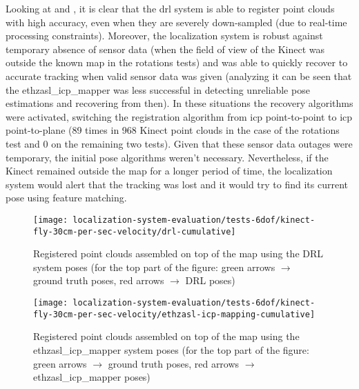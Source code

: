 Looking at  and , it is clear that the \gls{drl} system is able to register point clouds with high accuracy, even when they are severely down-sampled (due to real-time processing constraints). Moreover, the localization system is robust against temporary absence of sensor data (when the field of view of the Kinect was outside the known map in the rotations tests) and was able to quickly recover to accurate tracking when valid sensor data was given (analyzing  it can be seen that the ethzasl\_icp\_mapper was less successful in detecting unreliable pose estimations and recovering from then). In these situations the recovery algorithms were activated, switching the registration algorithm from \gls{icp} point-to-point to \gls{icp} point-to-plane (89 times in 968 Kinect point clouds in the case of the rotations test and 0 on the remaining two tests). Given that these sensor data outages were temporary, the initial pose algorithms weren't necessary. Nevertheless, if the Kinect remained outside the map for a longer period of time, the localization system would alert that the tracking was lost and it would try to find its current pose using feature matching.

\begin{figure}[H]
	\centering
	\texttt{[image: localization-system-evaluation/tests-6dof/kinect-fly-30cm-per-sec-velocity/drl-cumulative]}
	\caption{Registered point clouds assembled on top of the map using the DRL system poses (for the top part of the figure: green arrows $\rightarrow$ ground truth poses, red arrows $\rightarrow$ DRL poses)}
	\label{fig:localization-system-evaluation_kinect-fly-30cm-per-sec-velocity-drl-cumulative}
\end{figure}

\begin{figure}[H]
	\centering
	\texttt{[image: localization-system-evaluation/tests-6dof/kinect-fly-30cm-per-sec-velocity/ethzasl-icp-mapping-cumulative]}
	\caption{Registered point clouds assembled on top of the map using the ethzasl\_icp\_mapper system poses (for the top part of the figure: green arrows $\rightarrow$ ground truth poses, red arrows $\rightarrow$ ethzasl\_icp\_mapper poses)}
	\label{fig:localization-system-evaluation_kinect-fly-30cm-per-sec-velocity-ethzasl-icp-mapping-cumulative}
\end{figure}

